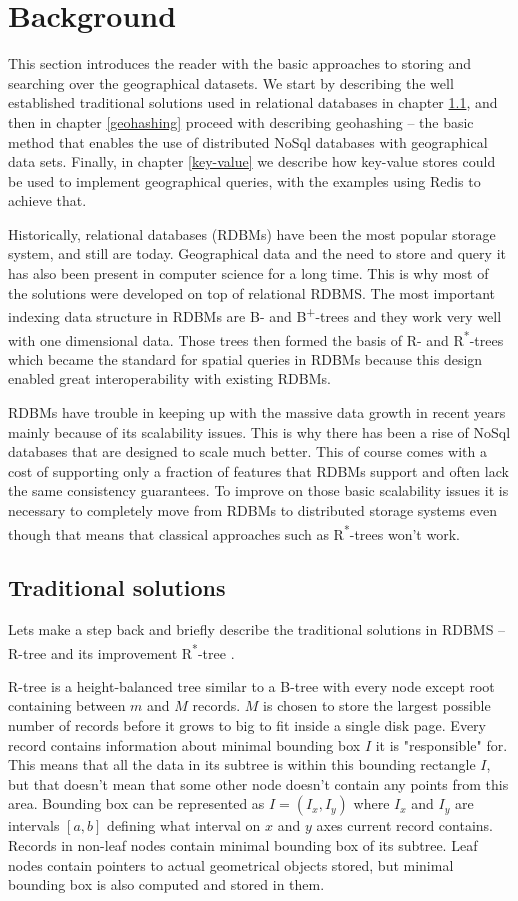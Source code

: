 \documentclass[times, utf8, diplomski]{fer}
\newcommand{\bplus}{B\textsuperscript{+}}
\newcommand{\rstar}{R\textsuperscript{*}}
\begin{document}
\chapter{Background}
This section introduces the reader with the basic approaches to storing and searching over the geographical datasets. We start by describing the well established traditional solutions used in relational databases in chapter \ref{traditional}, and then in chapter \ref{geohashing} proceed with describing geohashing -- the basic method that enables the use of distributed NoSql databases with geographical data sets. Finally, in chapter \ref{key-value} we describe how key-value stores could be used to implement geographical queries, with the examples using Redis to achieve that.

Historically, relational databases (RDBMs) have been the most popular storage system, and still are today. Geographical data and the need to store and query it has also been present in computer science for a long time. This is why most of the solutions were developed on top of relational RDBMS. The most important indexing data structure in RDBMs are B- and \bplus-trees and they work very well with one dimensional data. Those trees then formed the basis of R- and \rstar-trees which became the standard for spatial queries in RDBMs because this design enabled great interoperability with existing RDBMs.

RDBMs have trouble in keeping up with the massive data growth in recent years mainly because of its scalability issues. This is why there has been a rise of NoSql databases that are designed to scale much better. This of course comes with a cost of supporting only a fraction of features that RDBMs support and often lack the same consistency guarantees. To improve on those basic scalability issues it is necessary to completely move from RDBMs to distributed storage systems even though that means that classical approaches such as \rstar-trees won't work.

\section{Traditional solutions} \label{traditional}
Lets make a step back and briefly describe the traditional solutions in RDBMS -- R-tree \citet{rtree} and its improvement \rstar-tree \citet{rstar}.

R-tree is a height-balanced tree similar to a B-tree with every node except root containing between $m$ and $M$ records. $M$ is chosen to store the largest possible number of records before it grows to big to fit inside a single disk page. Every record contains information about minimal bounding box $I$ it is "responsible" for. This means that all the data in its subtree is within this bounding rectangle $I$, but that doesn't mean that some other node doesn't contain any points from this area. Bounding box can be represented as $I = (I_x, I_y)$ where $I_x$ and $I_y$ are intervals $[a, b]$ defining what interval on $x$ and $y$ axes current record contains. Records in non-leaf nodes contain minimal bounding box of its subtree. Leaf nodes contain pointers to actual geometrical objects stored, but minimal bounding box is also computed and stored in them.
\end{document}
